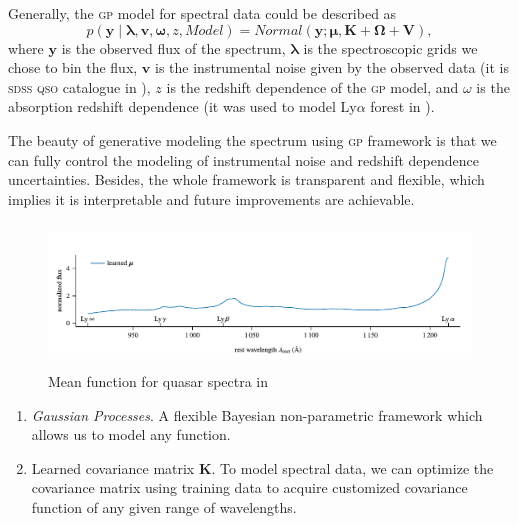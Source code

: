 \documentclass{ar-1col}
\begin{document}
Generally, the \textsc{gp} model for spectral data could be described as
\begin{equation}
    p( \mathbf{y} \mid \mathbf{\lambda}, \mathbf{v}, \mathbf{\omega}, z, Model ) 
    = Normal( \mathbf{y}; \mathbf{\mu}, \mathbf{K} + \mathbf{\Omega} + \mathbf{V} ), 
\end{equation}
where $\mathbf{y}$ is the observed flux of the spectrum, 
$\mathbf{\lambda}$ is the spectroscopic grids we chose to bin the flux, 
$\mathbf{v}$ is the instrumental noise given by the observed data (it is \textsc{sdss} \textsc{qso} catalogue \citep{SDSS09} in \citet{Garnett17}), $z$ is the redshift dependence of the \textsc{gp} model, and $\omega$ is the absorption redshift dependence (it was used to model
 Ly$\alpha$ forest in \citet{Garnett17}). 
 
The beauty of generative modeling the spectrum using \textsc{gp} framework is that we can fully control the modeling of instrumental noise and redshift dependence uncertainties. 
Besides, the whole framework is transparent and flexible, which implies it is interpretable and future improvements are achievable. 


\begin{figure}
    \includegraphics[width=5in, height=1.5in]{images/mean_function.pdf}
    \caption{Mean function for quasar spectra in \citet{Garnett17}}
    \label{fig:mean_function}
\end{figure}


\begin{summary}
    \begin{enumerate}
    \item \textit{Gaussian Processes}. A flexible Bayesian non-parametric framework which allows us to model any function.
    \item Learned covariance matrix $\mathbf{K}$. To model spectral data, we can optimize the covariance matrix using training data to acquire customized covariance function of any given range of wavelengths.
    \end{enumerate}
\end{summary}
    
\end{document}
